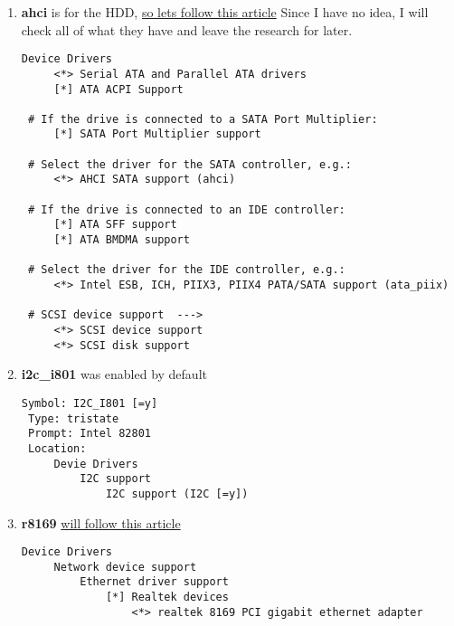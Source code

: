 \documentclass[10pt,a4paper]{article}
\begin{document}
\begin{enumerate}
                   \newpage
                   \item \textbf{ahci} is for the HDD, \href{https://wiki.gentoo.org/wiki/HDD#Kernel}{so lets follow this article} Since I have no idea, I will check all of what they have and leave the research for later.
                   
                   \begin{lstlisting}[style=KernelConfig]
 Device Drivers
     <*> Serial ATA and Parallel ATA drivers
     [*] ATA ACPI Support
 
 # If the drive is connected to a SATA Port Multiplier:
     [*] SATA Port Multiplier support
 
 # Select the driver for the SATA controller, e.g.:
     <*> AHCI SATA support (ahci)
 
 # If the drive is connected to an IDE controller:
     [*] ATA SFF support
     [*] ATA BMDMA support
 
 # Select the driver for the IDE controller, e.g.:
     <*> Intel ESB, ICH, PIIX3, PIIX4 PATA/SATA support (ata_piix)
 
 # SCSI device support  ---> 
     <*> SCSI device support
     <*> SCSI disk support 
                   \end{lstlisting}
                   
                   \newpage
                   \item \textbf{i2c\_i801} was enabled by default
                   \begin{lstlisting}[style=KernelConfig]
 Symbol: I2C_I801 [=y]
 Type: tristate
 Prompt: Intel 82801
 Location:
     Devie Drivers
         I2C support
             I2C support (I2C [=y])
                   \end{lstlisting}

                    \newpage
                    \item \textbf{r8169} \href{https://wiki.gentoo.org/wiki/Ethernet#Kernel}{will follow this article}
                    
                    \begin{lstlisting}[style=KernelConfig]
 Device Drivers
     Network device support
         Ethernet driver support
             [*] Realtek devices
                 <*> realtek 8169 PCI gigabit ethernet adapter
                    \end{lstlisting}
                    

\end{enumerate}
\end{document}
